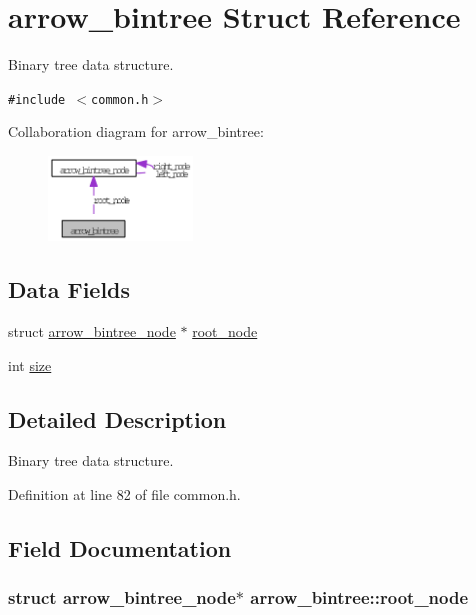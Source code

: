 \hypertarget{structarrow__bintree}{
\section{arrow\_\-bintree Struct Reference}
\label{structarrow__bintree}
}
Binary tree data structure.  


{\tt \#include $<$common.h$>$}

Collaboration diagram for arrow\_\-bintree:\nopagebreak
\begin{figure}[H]
\begin{center}
\leavevmode
\includegraphics[width=109pt]{structarrow__bintree__coll__graph}
\end{center}
\end{figure}
\subsection*{Data Fields}
\begin{CompactItemize}
\item 
struct \hyperlink{structarrow__bintree__node}{arrow\_\-bintree\_\-node} $\ast$ \hyperlink{structarrow__bintree_09f6d0bd6e32ae2c2f8df57a31388df6}{root\_\-node}
\item 
int \hyperlink{structarrow__bintree_7570628df0b5317cc8e240499ba12974}{size}
\end{CompactItemize}


\subsection{Detailed Description}
Binary tree data structure. 

Definition at line 82 of file common.h.

\subsection{Field Documentation}
\hypertarget{structarrow__bintree_09f6d0bd6e32ae2c2f8df57a31388df6}{
\subsubsection{\setlength{\rightskip}{0pt plus 5cm}struct {\bf arrow\_\-bintree\_\-node}$\ast$ {\bf arrow\_\-bintree::root\_\-node}}}
\label{structarrow__bintree_09f6d0bd6e32ae2c2f8df57a31388df6}



